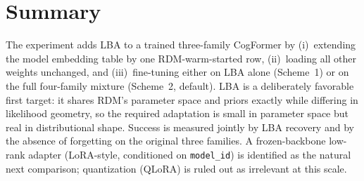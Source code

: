 \documentclass[11pt]{article}
\begin{document}
\section{Summary}

The experiment adds LBA to a trained three-family CogFormer by (i)~extending the
model embedding table by one RDM-warm-started row, (ii)~loading all other weights
unchanged, and (iii)~fine-tuning either on LBA alone (Scheme~1) or on the full
four-family mixture (Scheme~2, default). LBA is a deliberately favorable first
target: it shares RDM's parameter space and priors exactly while differing in
likelihood geometry, so the required adaptation is small in parameter space but
real in distributional shape. Success is measured jointly by LBA recovery and by
the absence of forgetting on the original three families. A frozen-backbone
low-rank adapter (LoRA-style, conditioned on \texttt{model\_id}) is identified as
the natural next comparison; quantization (QLoRA) is ruled out as irrelevant at
this scale.
\end{document}
